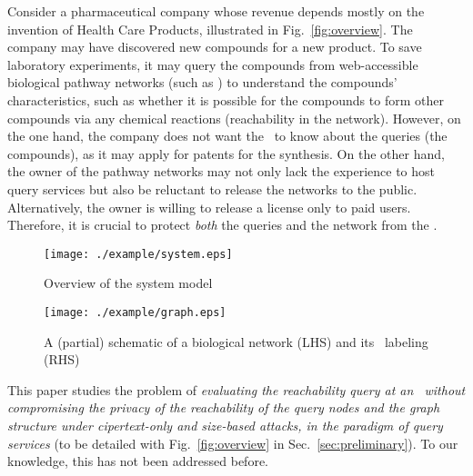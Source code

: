 \stab
{} Consider a pharmaceutical company
whose revenue depends mostly on the invention of Health Care Products,
illustrated in Fig.~\ref{fig:overview}. The company may have
discovered new compounds for a new product. To save laboratory
experiments, it may query the compounds from web-accessible biological
pathway networks (such as \cite{biology}) to understand the compounds'
characteristics, such as whether it is possible for the compounds to
form other compounds via any chemical reactions (reachability in the
network). However, on the one hand, the company does not want the
\SP\ to know about the queries (the compounds), as it may apply for
patents for the synthesis. On the other hand, the owner of the pathway
networks may not only lack the experience to host query services but
also be reluctant to release the networks to the public.
Alternatively, the owner is willing to release a license only to paid
users.  Therefore, it is crucial to protect {\em both} the queries and
the network from the \SP.



\begin{figure}[t]
\begin{minipage}[t]{0.5\linewidth}
\centering
\texttt{[image: ./example/system.eps]}
\vspace{-2ex}
\caption{Overview of the system model}
\label{fig:overview}
\end{minipage}%
\begin{minipage}[t]{0.5\linewidth}
\centering
\texttt{[image: ./example/graph.eps]}
\vspace{-4ex}
\caption{A (partial) schematic of a biological network  (LHS) and its \hop\ labeling (RHS)}
\label{fig:2hop}
\end{minipage}
\end{figure}

\stab
This paper studies the problem of {\em evaluating the reachability
  query at an \SP\ without compromising the privacy of the
  reachability of the query nodes and the graph structure under
  cipertext-only and size-based attacks, in the paradigm of query
  services} (to be detailed with Fig.~\ref{fig:overview} in
Sec.~\ref{sec:preliminary}). To our knowledge, this has not been  addressed before.



